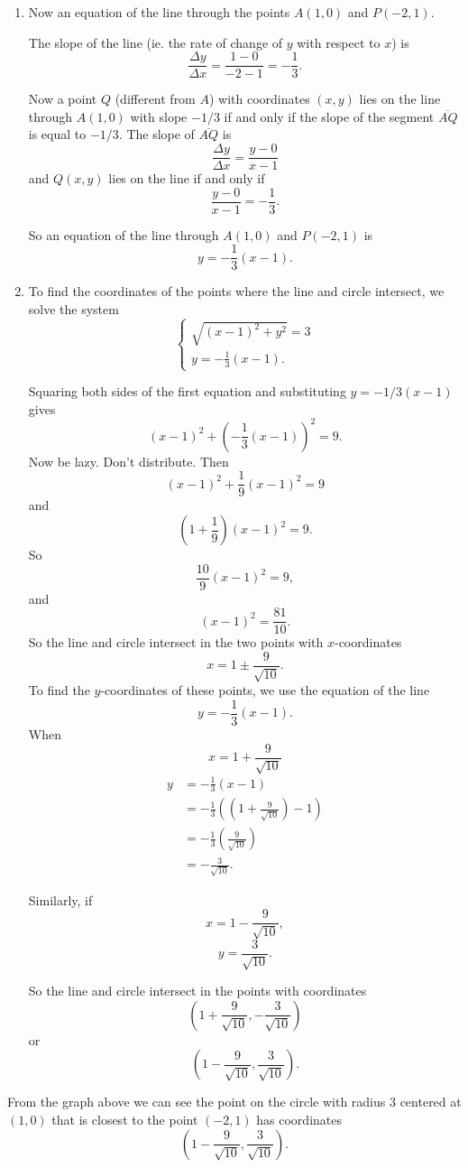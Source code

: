 \documentclass{ximera}
\begin{document}
\begin{question}
\begin{explanation}
\begin{enumerate}
\item Now an equation of the line through the points $A(1,0)$ and $P(-2,1)$.

The slope of the line (ie. the rate of change of $y$ with respect to $x$) is
\[
 \frac{\Delta y}{\Delta x} = \frac{1-0}{-2-1} = - \frac{1}{3}.
\]

Now a point $Q$ (different from $A$) with coordinates $(x,y)$ lies on the line through $A(1,0)$ with slope $-1/3$ if and only if the slope of the segment $\overline{AQ}$ is equal to $-1/3$. The slope of $\overline{AQ}$ is
\[
     \frac{\Delta y}{\Delta x} = \frac{y-0}{x-1}
\]
and $Q(x,y)$ lies on the line if and only if
\[
  \frac{y-0}{x-1} = - \frac{1}{3} .
\]

So an equation of the line through $A(1,0)$ and $P(-2,1)$ is
\[
        y = -\frac{1}{3}(x-1) .
\]

\item To find the coordinates of the points where the line and circle intersect, we solve the system
\[
 \begin{cases}
       \sqrt{(x-1)^2+y^2} = 3 \\
        y = -\frac{1}{3}(x-1) . 
\end{cases}
\]

Squaring both sides of the first equation and substituting $y=-1/3(x-1)$ gives
\[
        (x-1)^2 + \left( - \frac{1}{3} (x-1)\right)^2 = 9 .
\]
Now be lazy. Don't distribute. Then
\[
 (x-1)^2 + \frac{1}{9}(x-1)^2 = 9
\]
and
\[
  \left(  1 + \frac{1}{9}  \right) (x-1)^2 = 9 .
\]
So
\[
  \frac{10}{9}(x-1)^2 = 9,
\]
and
\[
   (x-1)^2 = \frac{81}{10} .
\]
So the line and circle intersect in the two points with $x$-coordinates
\[
    x = 1 \pm \frac{9}{\sqrt{10}} .
\]
To find the $y$-coordinates of these points, we use the equation of the line 
\[
    y = -\frac{1}{3}(x-1) .
\]
When
\[
  x = 1 + \frac{9}{\sqrt{10}}
\]
\begin{align*}
y &= -\frac{1}{3}(x-1) \\
   &= -\frac{1}{3} \left( \left( 1 + \frac{9}{\sqrt{10}} \right)  - 1\right) \\
   &=  -\frac{1}{3} \left(\frac{9}{\sqrt{10}} \right) \\
   &= -\frac{3}{\sqrt{10}}.
\end{align*}

Similarly, if 
\[
  x = 1 - \frac{9}{\sqrt{10}},
\]
\[
     y = \frac{3}{\sqrt{10}} .
\]

So the line and circle intersect in the points with coordinates
\[
  \left(  1 + \frac{9}{\sqrt{10}} , -\frac{3}{\sqrt{10}} \right)
\]
or
\[
     \left(  1 - \frac{9}{\sqrt{10}} , \frac{3}{\sqrt{10}} \right) .
\]
\end{enumerate}

From the graph above we can see the point on the circle with radius $3$ centered at $(1,0)$ that is closest to the point $(-2,1)$ has coordinates
\[
     \left(  1 - \frac{9}{\sqrt{10}} , \frac{3}{\sqrt{10}} \right) .
\]

\end{explanation}
\end{question}
\end{document}
